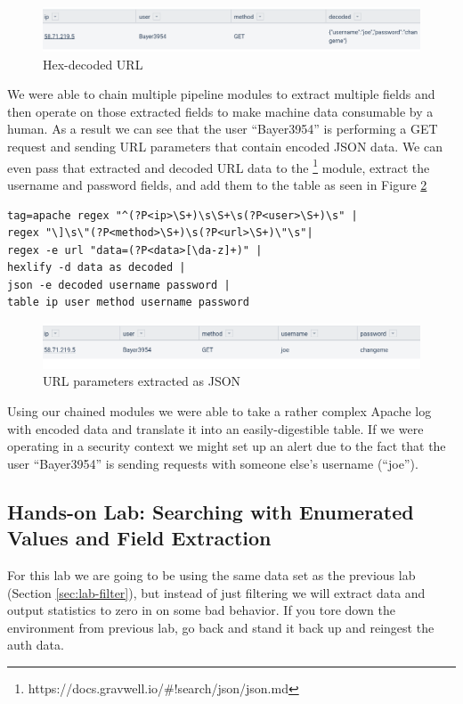 \begin{figure}
	\includegraphics[width=0.8\linewidth]{images/hex-decode-url.png}
	\caption{Hex-decoded URL}
	\label{fig:hex-decode-url} 
\end{figure}

We were able to chain multiple pipeline modules to extract multiple
fields and then operate on those extracted fields to make machine data
consumable by a human. As a result we can see that the user
``Bayer3954'' is performing a GET request and sending URL parameters
that contain encoded JSON data. We can even pass that extracted and
decoded URL data to the \footnote{https://docs.gravwell.io/\#!search/json/json.md}
module, extract the username and password fields, and add them to the table as
seen in Figure \ref{fig:url-extract-json}

\begin{Verbatim}[breaklines=true]
tag=apache regex "^(?P<ip>\S+)\s\S+\s(?P<user>\S+)\s" |
regex "\]\s\"(?P<method>\S+)\s(?P<url>\S+)\"\s"|
regex -e url "data=(?P<data>[\da-z]+)" |
hexlify -d data as decoded |
json -e decoded username password |
table ip user method username password
\end{Verbatim}

\begin{figure}
	\includegraphics[width=0.8\linewidth]{images/url-extract-json.png}
	\caption{URL parameters extracted as JSON}
	\label{fig:url-extract-json}
\end{figure}

Using our chained modules we were able to take a rather complex Apache
log with encoded data and translate it into an easily-digestible table.
If we were operating in a security context we might set up an alert due
to the fact that the user ``Bayer3954'' is sending requests with someone
else's username (``joe'').


\subsection{Hands-on Lab: Searching with Enumerated Values and Field Extraction}

For this lab we are going to be using the same data set as the previous lab (Section \ref{sec:lab-filter}), but
instead of just filtering we will extract data and output statistics to
zero in on some bad behavior. If you tore down the environment from
previous lab, go back and stand it back up and reingest the auth data.

